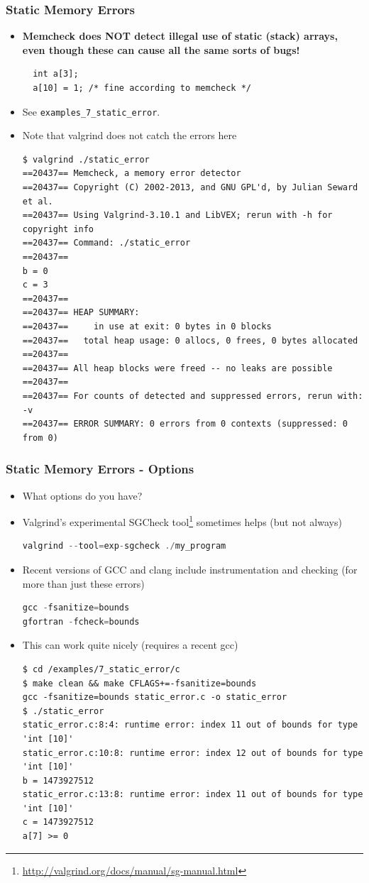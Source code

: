 \documentclass{beamer}
\begin{document}
\begin{frame}[fragile]
\frametitle{Static Memory Errors}
\begin{itemize}
\item \textbf{Memcheck does NOT detect illegal use of static (stack) arrays, even though these can cause all the same sorts of bugs!}
  \begin{lstlisting}
  int a[3];
  a[10] = 1; /* fine according to memcheck */
  \end{lstlisting}
\item See \texttt{examples\_7\_static\_error}.
\item Note that valgrind does not catch the errors here
\begin{lstlisting}
$ valgrind ./static_error
==20437== Memcheck, a memory error detector
==20437== Copyright (C) 2002-2013, and GNU GPL'd, by Julian Seward et al.
==20437== Using Valgrind-3.10.1 and LibVEX; rerun with -h for copyright info
==20437== Command: ./static_error
==20437==
b = 0
c = 3
==20437==
==20437== HEAP SUMMARY:
==20437==     in use at exit: 0 bytes in 0 blocks
==20437==   total heap usage: 0 allocs, 0 frees, 0 bytes allocated
==20437==
==20437== All heap blocks were freed -- no leaks are possible
==20437==
==20437== For counts of detected and suppressed errors, rerun with: -v
==20437== ERROR SUMMARY: 0 errors from 0 contexts (suppressed: 0 from 0)
\end{lstlisting}
\end{itemize}
\end{frame}

\begin{frame}[fragile]
\frametitle{Static Memory Errors - Options}
\begin{itemize}
\item What options do you have?
\item Valgrind's experimental SGCheck tool\footnote{\url{http://valgrind.org/docs/manual/sg-manual.html}} sometimes helps (but not always)
\begin{lstlisting}[language=C++]
valgrind --tool=exp-sgcheck ./my_program
\end{lstlisting}
\item Recent versions of GCC and clang include instrumentation and checking (for more than just these errors)
\begin{lstlisting}[language=C++]
gcc -fsanitize=bounds
gfortran -fcheck=bounds
\end{lstlisting}
\item This can work quite nicely (requires a recent gcc)
\begin{lstlisting}
$ cd /examples/7_static_error/c
$ make clean && make CFLAGS+=-fsanitize=bounds
gcc -fsanitize=bounds static_error.c -o static_error
$ ./static_error
static_error.c:8:4: runtime error: index 11 out of bounds for type 'int [10]'
static_error.c:10:8: runtime error: index 12 out of bounds for type 'int [10]'
b = 1473927512
static_error.c:13:8: runtime error: index 11 out of bounds for type 'int [10]'
c = 1473927512
a[7] >= 0
\end{lstlisting}
\end{itemize}
\end{frame}
\end{document}
